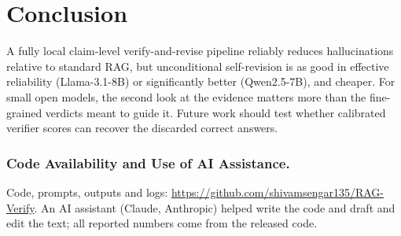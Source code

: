 \documentclass{svproc}
\begin{document}
\section{Conclusion}
A fully local claim-level verify-and-revise pipeline reliably reduces hallucinations relative to standard RAG, but unconditional self-revision is as good in effective reliability (Llama-3.1-8B) or significantly better (Qwen2.5-7B), and cheaper. For small open models, the second look at the evidence matters more than the fine-grained verdicts meant to guide it. Future work should test whether calibrated verifier scores can recover the discarded correct answers.

\subsubsection*{Code Availability and Use of AI Assistance.} Code, prompts, outputs and logs: \url{https://github.com/shivamsengar135/RAG-Verify}. An AI assistant (Claude, Anthropic) helped write the code and draft and edit the text; all reported numbers come from the released code.



\end{document}
